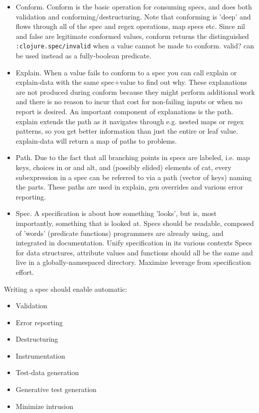 \begin{itemize}
\item Conform. Conform is the basic operation for consuming specs, and does both
  validation and conforming/destructuring. Note that conforming is 'deep' and
  flows through all of the spec and regex operations, map specs etc. Since nil
  and false are legitimate conformed values, conform returns the distinguished
  \texttt{:clojure.spec/invalid} when a value cannot be made to conform. valid?
  can be used instead as a fully-boolean predicate.

\item Explain. When a value fails to conform to a spec you can call explain or
  explain-data with the same spec+value to find out why. These explanations are
  not produced during conform because they might perform additional work and
  there is no reason to incur that cost for non-failing inputs or when no report
  is desired. An important component of explanations is the path. explain
  extends the path as it navigates through e.g. nested maps or regex patterns,
  so you get better information than just the entire or leaf value. explain-data
  will return a map of paths to problems.

\item Path. Due to the fact that all branching points in specs are labeled, i.e.
  map keys, choices in or and alt, and (possibly elided) elements of cat, every
  subexpression in a spec can be referred to via a path (vector of keys) naming
  the parts. These paths are used in explain, gen overrides and various error
  reporting.

\item Spec. A specification is about how something 'looks', but is, most
  importantly, something that is looked at. Specs should be readable, composed
  of 'words' (predicate functions) programmers are already using, and integrated
  in documentation. Unify specification in its various contexts Specs for data
  structures, attribute values and functions should all be the same and live in
  a globally-namespaced directory. Maximize leverage from specification effort.

\end{itemize}

Writing a spec should enable automatic:

\begin{itemize}
\item Validation
\item Error reporting
\item Destructuring
\item Instrumentation
\item Test-data generation
\item Generative test generation
\item Minimize intrusion
\end{itemize}

